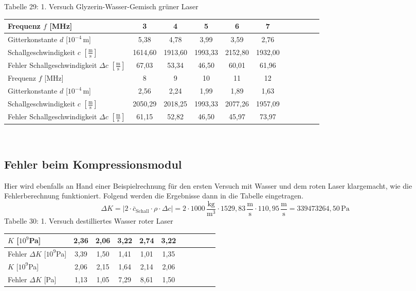 \documentclass[fontsize=12pt]{scrartcl}
\begin{document}
~\\
~\\
Tabelle 29: 1. Versuch Glyzerin-Wasser-Gemisch grüner Laser\\
\begin{tabular}{|l|c|c|c|c|c|c|c|c|c|c|} \hline
Frequenz $f$ [MHz] & 3 & 4 & 5 & 6 & 7 \\ \hline
Gitterkonstante $d$ [$10^{-4}$\,m] & 5,38 & 4,78 & 3,99 & 3,59 & 2,76   \\ \hline
Schallgeschwindigkeit $c$ $[\frac{{\text{m}}}{{\text{s}}}]$ & 1614,60 & 1913,60 & 1993,33 & 2152,80 & 1932,00  \\ \hline
Fehler Schallgeschwindigkeit $\Delta c$ $[\frac{{\text{m}}}{{\text{s}}}]$ & 67,03 & 
53,34  & 
46,50 & 
60,01 & 
61,96 
 \\ \hline
Frequenz $f$ [MHz] & 8 & 9 & 10 & 11 & 12\\ \hline
Gitterkonstante $d$ [$10^{-4}$\,m] &  2,56 & 2,24 & 1,99 &  1,89  & 1,63  \\ \hline
Schallgeschwindigkeit $c$ $[\frac{{\text{m}}}{{\text{s}}}]$ & 2050,29 &  2018,25 & 1993,33 & 2077,26 & 1957,09  \\ \hline
Fehler Schallgeschwindigkeit $\Delta c$ $[\frac{{\text{m}}}{{\text{s}}}]$ & 
61,15 & 
52,82 & 
46,50 & 
45,97 & 
73,97 \\ \hline
\end{tabular} \\


\subsection{Fehler beim Kompressionsmodul}

Hier wird ebenfalls an Hand einer Beispielrechnung für den ersten Versuch mit Wasser und dem roten Laser klargemacht, wie die Fehlerberechnung funktioniert. Folgend werden die Ergebnisse dann in die Tabelle eingetragen.
\begin{equation*}
\Delta K=\vert 2\cdot \bar{c}_{\text{Schall}} \cdot \rho \cdot \Delta c \vert = 2\cdot  1000\,\frac{{\text{kg}}}{{\text{m}^3}}\cdot1529,83\,\frac{{\text{m}}}{{\text{s}}}\cdot 110,95\,\frac{{\text{m}}}{{\text{s}}} = 339473264,50\,{\text{Pa}}
\end{equation*}
\noindent
Tabelle 30: 1. Versuch destilliertes Wasser roter Laser  \\
\begin{tabular}{|l|c|c|c|c|c|c|c|c|c|c|} \hline
$K$ [$10^9$Pa] & 2,36 & 2,06 & 3,22 & 2,74 & 3,22  \\ \hline
Fehler $\Delta K$ [$10^9$Pa] & 3,39 &
1,50 & 
1,41 & 
1,01 & 
1,35 
  \\ \hline
$K$ [$10^9$Pa] & 2,06 & 2,15 & 1,64 & 2,14 & 2,06  \\ \hline
Fehler $\Delta K$ [Pa] & 
1,13 & 
1,05 & 
7,29 & 
8,61 & 
1,50 \\ \hline
\end{tabular} \\
\end{document}
